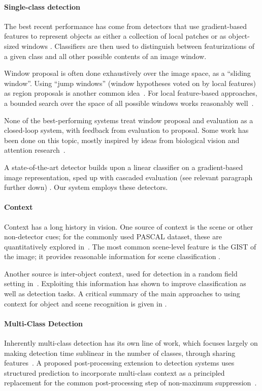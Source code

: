 \paragraph{Single-class detection}
The best recent performance has come from detectors that use gradient-based features to represent objects as either a collection of local patches or as object-sized windows \cite{Dalal2005,Lowe2004}.
Classifiers are then used to distinguish between featurizations of a given class and all other possible contents of an image window.

Window proposal is often done exhaustively over the image space, as a ``sliding window''.
Using ``jump windows'' (window hypotheses voted on by local features) as region proposals is another common idea~\cite{Vedaldi2009,Vijayanarasimhan2011}.
For local feature-based approaches, a bounded search over the space of all possible windows works reasonably well~\cite{Lampert2008b}.

None of the best-performing systems treat window proposal and evaluation as a closed-loop system, with feedback from evaluation to proposal.
Some work has been done on this topic, mostly inspired by ideas from biological vision and attention research~\cite{Butko2009,Vogel2008,Paletta2005}.

A state-of-the-art detector builds upon a linear classifier on a gradient-based image representation, sped up with cascaded evaluation (see relevant paragraph further down) \cite{Felzenszwalb2010b}.
Our system employs these detectors.

\paragraph{Context}
Context has a long history in vision.
One source of context is the scene or other non-detector cues; for the commonly used PASCAL dataset, these are quantitatively explored in~\cite{Divvala2009}. 
The most common scene-level feature is the GIST \cite{Oliva2001a} of the image; it provides reasonable information for scene classification \cite{Xiao2010a}.

Another source is inter-object context, used for detection in a random field setting in~\cite{Torralba2004}.
Exploiting this information has shown to improve classification as well as detection tasks.
A critical summary of the main approaches to using context for object and scene recognition is given in \cite{Galleguillos2010}.

\paragraph{Multi-Class Detection}
Inherently multi-class detection has its own line of work, which focuses largely on making detection time sublinear in the number of classes, through sharing features~\cite{Torralba2007,Fan2005,Razavi2011}.
A proposed post-processing extension to detection systems uses structured prediction to incorporate multi-class context as a principled replacement for the common post-processing step of non-maximum suppression~\cite{Desai2009}.


